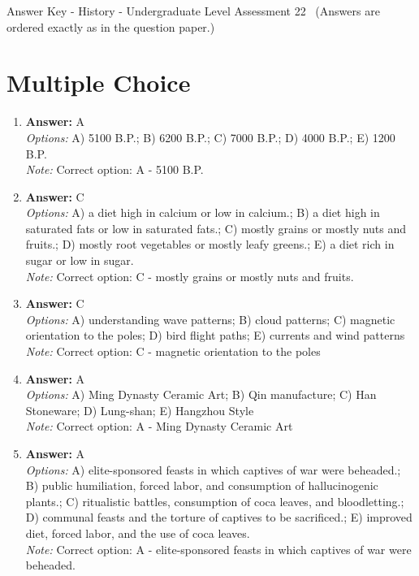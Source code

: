 \documentclass[12pt]{article}
\begin{document}
\begin{center}
Answer Key - History - Undergraduate Level Assessment 22 \
\small (Answers are ordered exactly as in the question paper.)
\end{center}

\section*{Multiple Choice}
\begin{enumerate}[label=\arabic*.]
\item \textbf{Answer:} A
\\ \textit{Options:} A) 5100 B.P.; B) 6200 B.P.; C) 7000 B.P.; D) 4000 B.P.; E) 1200 B.P.
\\ \textit{Note:} Correct option: A - 5100 B.P.
\item \textbf{Answer:} C
\\ \textit{Options:} A) a diet high in calcium or low in calcium.; B) a diet high in saturated fats or low in saturated fats.; C) mostly grains or mostly nuts and fruits.; D) mostly root vegetables or mostly leafy greens.; E) a diet rich in sugar or low in sugar.
\\ \textit{Note:} Correct option: C - mostly grains or mostly nuts and fruits.
\item \textbf{Answer:} C
\\ \textit{Options:} A) understanding wave patterns; B) cloud patterns; C) magnetic orientation to the poles; D) bird flight paths; E) currents and wind patterns
\\ \textit{Note:} Correct option: C - magnetic orientation to the poles
\item \textbf{Answer:} A
\\ \textit{Options:} A) Ming Dynasty Ceramic Art; B) Qin manufacture; C) Han Stoneware; D) Lung-shan; E) Hangzhou Style
\\ \textit{Note:} Correct option: A - Ming Dynasty Ceramic Art
\item \textbf{Answer:} A
\\ \textit{Options:} A) elite-sponsored feasts in which captives of war were beheaded.; B) public humiliation, forced labor, and consumption of hallucinogenic plants.; C) ritualistic battles, consumption of coca leaves, and bloodletting.; D) communal feasts and the torture of captives to be sacrificed.; E) improved diet, forced labor, and the use of coca leaves.
\\ \textit{Note:} Correct option: A - elite-sponsored feasts in which captives of war were beheaded.
\end{enumerate}
\end{document}
